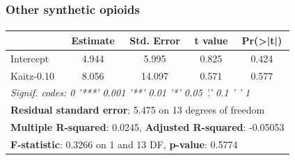 \begin{frame}[shrink=5]

    \label{table_othersync}
    
    \frametitle{Other synthetic opioids} %
    \framesubtitle{}  %
    \rmfamily %

    \begin{table}[ht]
        \centering
        \begin{tabular}{lcccc}
        \toprule
         & \textbf{Estimate} & \textbf{Std. Error} & \textbf{t value} & \textbf{Pr(>|t|)} \\
        \midrule
        Intercept  & 4.944 & 5.995 & 0.825 & 0.424 \\
        Kaitz-0.10 & 8.056 & 14.097 & 0.571 & 0.577 \\
        \midrule
        \multicolumn{5}{l}{\textit{Signif. codes:  0 '***' 0.001 '**' 0.01 '*' 0.05 '.' 0.1 ' ' 1}} \\
        \midrule
        \multicolumn{5}{l}{\textbf{Residual standard error}: 5.475 on 13 degrees of freedom} \\
        \multicolumn{5}{l}{\textbf{Multiple R-squared}: 0.0245, \textbf{Adjusted R-squared}: -0.05053} \\
        \multicolumn{5}{l}{\textbf{F-statistic}: 0.3266 on 1 and 13 DF, \textbf{p-value}: 0.5774} \\
        \bottomrule
        \end{tabular}
    \end{table}
    
    \hyperlink{heroin_result}{}
    
\end{frame}



